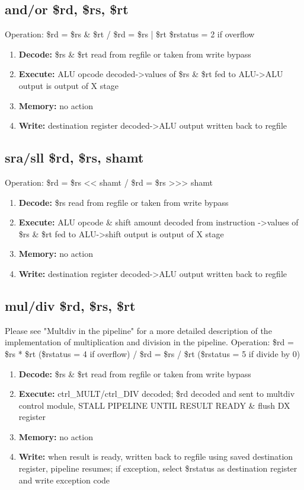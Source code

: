 \documentclass[letterpaper]{article}
\begin{document}
\subsection{and/or \$rd, \$rs, \$rt}
Operation: \$rd = \$rs \& \$rt / \$rd = \$rs | \$rt
\$rstatus = 2 if overflow
\begin{enumerate}
    \item \textbf{Decode:} \$rs \& \$rt read from regfile or taken from write bypass
    \item \textbf{Execute:} ALU opcode decoded->values of \$rs \& \$rt  fed to ALU->ALU output is output of X stage
    \item \textbf{Memory:} no action
    \item \textbf{Write:} destination register decoded->ALU output written back to regfile
\end{enumerate}

\subsection{sra/sll \$rd, \$rs, shamt}
Operation: \$rd = \$rs << shamt / \$rd = \$rs >>> shamt
\begin{enumerate}
    \item \textbf{Decode:} \$rs read from regfile or taken from write bypass
    \item \textbf{Execute:} ALU opcode \& shift amount decoded from instruction ->values of \$rs \& \$rt  fed to ALU->shift output is output of X stage
    \item \textbf{Memory:} no action
    \item \textbf{Write:} destination register decoded->ALU output written back to regfile
\end{enumerate}

\subsection{mul/div \$rd, \$rs, \$rt}
Please see "Multdiv in the pipeline" for a more detailed description of the implementation of multiplication and division in the pipeline.
Operation: \$rd = \$rs * \$rt (\$rstatus = 4 if overflow) /
\$rd = \$rs / \$rt (\$rstatus = 5 if divide by 0)
\begin{enumerate}
    \item \textbf{Decode:} \$rs \& \$rt read from regfile or taken from write bypass
    \item \textbf{Execute:} ctrl\_MULT/ctrl\_DIV decoded; \$rd decoded and sent to multdiv control module, STALL PIPELINE UNTIL RESULT READY & flush DX register
    \item \textbf{Memory:} no action
    \item \textbf{Write:} when result is ready, written back to regfile using saved destination register, pipeline resumes; if exception, select \$rstatus as destination register and write exception code
\end{enumerate}
\end{document}
